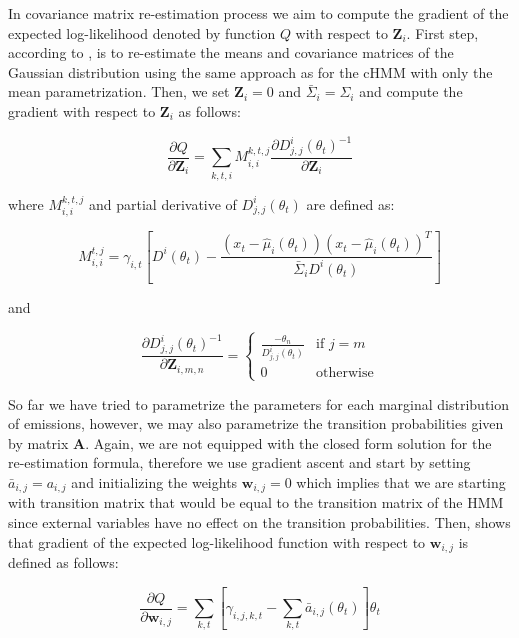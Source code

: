 In covariance matrix re-estimation process we aim to compute the gradient of the expected log-likelihood denoted by function $Q$ with respect to $\textbf{Z}_i$.
First step, according to \citep{Radenen2014}, is to re-estimate the means and covariance matrices of the Gaussian distribution using the same approach as for 
the cHMM with only the mean parametrization. Then, we set $\textbf{Z}_i = 0$ and $\bar{\Sigma}_i = \Sigma_i$ and compute the gradient with respect to $\textbf{Z}_i$ as follows:

\begin{equation}
    \frac{\partial Q}{\partial \textbf{Z}_i} = \sum_{k,t,i} M_{i,i}^{k,t,j} \frac{\partial D_{j,j}^i(\theta_t)^{-1}}{\partial \textbf{Z}_i}
\end{equation}

where $M_{i,i}^{k,t,j}$ and partial derivative of $D_{j,j}^i(\theta_t)$ are defined as:

\begin{equation}
    M_{i,i}^{t,j} = \gamma_{i,t} \left[ D^i(\theta_t) - \frac{(x_t - \hat{\mu}_i(\theta_t))(x_t - \hat{\mu}_i(\theta_t))^T}{\bar{\Sigma}_i D^i(\theta_t)} \right]
\end{equation}

and 

\begin{equation}
    \frac{\partial D_{j,j}^i(\theta_t)^{-1}}{\partial \textbf{Z}_{i,m,n}} =
    \begin{cases} 
        \frac{-\theta_n}{D_{j,j}^i(\theta_t)} & \text{if } j = m \\
        0 & \text{otherwise}
    \end{cases}
\end{equation}

So far we have tried to parametrize the parameters for each marginal distribution of emissions, however, we may also parametrize the transition probabilities
given by matrix $\textbf{A}$. Again, we are not equipped with the closed form solution for the re-estimation formula, therefore we use gradient ascent and start by setting $\bar{a}_{i,j} = a_{i,j}$
and initializing the weights $\textbf{w}_{i,j}=0$ which implies that we are starting with transition matrix that would be equal to the transition matrix of the HMM since 
external variables have no effect on the transition probabilities. Then, \citep{Radenen2014} shows that gradient of the expected log-likelihood function with respect to
$\textbf{w}_{i,j}$ is defined as follows:

\begin{equation}
    \frac{\partial Q}{\partial \textbf{w}_{i,j}} = \sum_{k,t} \left[\gamma_{i,j,k,t} - \sum_{k,t} \bar{a}_{i,j}(\theta_t) \right] \theta_t
\end{equation}

